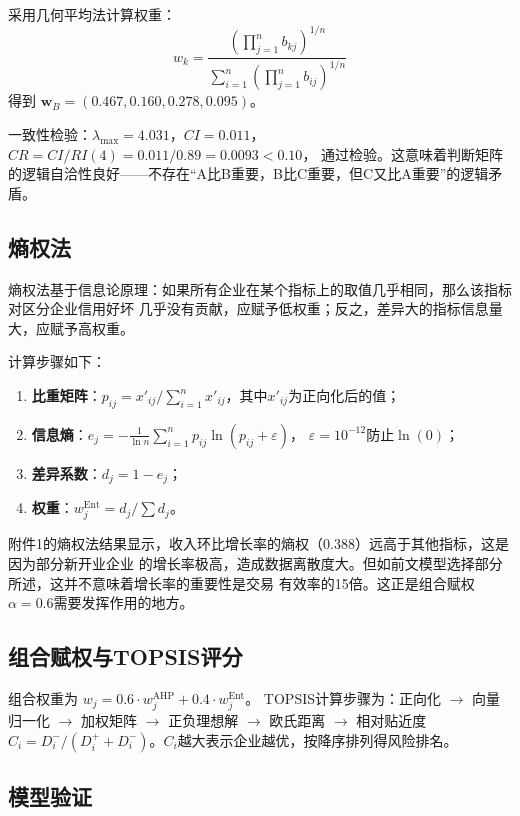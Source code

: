 \documentclass[12pt,a4paper]{ctexart}
\begin{document}
采用几何平均法计算权重：
\begin{equation}
w_k = \frac{\left(\prod_{j=1}^{n} b_{kj}\right)^{1/n}}{\sum_{i=1}^{n}\left(\prod_{j=1}^{n} b_{ij}\right)^{1/n}}
\end{equation}
得到 $\mathbf{w}_B = (0.467, 0.160, 0.278, 0.095)$。

一致性检验：$\lambda_{\max} = 4.031$，$CI = 0.011$，$CR = CI/RI(4) = 0.011/0.89 = 0.0093 < 0.10$，
通过检验。这意味着判断矩阵的逻辑自洽性良好——不存在``A比B重要，B比C重要，但C又比A重要''的逻辑矛盾。

\subsection{熵权法}

熵权法基于信息论原理：如果所有企业在某个指标上的取值几乎相同，那么该指标对区分企业信用好坏
几乎没有贡献，应赋予低权重；反之，差异大的指标信息量大，应赋予高权重。

计算步骤如下：
\begin{enumerate}
    \item \textbf{比重矩阵}：$p_{ij} = x'_{ij} / \sum_{i=1}^{n} x'_{ij}$，其中$x'_{ij}$为正向化后的值；
    \item \textbf{信息熵}：$e_j = -\frac{1}{\ln n}\sum_{i=1}^{n} p_{ij} \ln(p_{ij} + \varepsilon)$，
          $\varepsilon = 10^{-12}$防止$\ln(0)$；
    \item \textbf{差异系数}：$d_j = 1 - e_j$；
    \item \textbf{权重}：$w_j^{\text{Ent}} = d_j / \sum d_j$。
\end{enumerate}

附件1的熵权法结果显示，收入环比增长率的熵权（0.388）远高于其他指标，这是因为部分新开业企业
的增长率极高，造成数据离散度大。但如前文模型选择部分所述，这并不意味着增长率的重要性是交易
有效率的15倍。这正是组合赋权$\alpha=0.6$需要发挥作用的地方。

\subsection{组合赋权与TOPSIS评分}

组合权重为 $w_j = 0.6 \cdot w_j^{\text{AHP}} + 0.4 \cdot w_j^{\text{Ent}}$。
TOPSIS计算步骤为：正向化 $\to$ 向量归一化 $\to$ 加权矩阵 $\to$ 正负理想解 $\to$ 欧氏距离
$\to$ 相对贴近度 $C_i = D_i^-/(D_i^++D_i^-)$。$C_i$越大表示企业越优，按降序排列得风险排名。

\subsection{模型验证}
\end{document}
